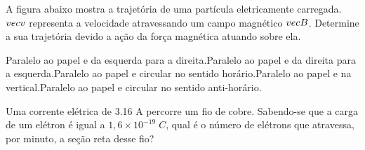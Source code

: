 \documentclass[12pt, addpoints]{exam}
\begin{document}
        \begin{questions}
\begin{multicols*}{2}
\question[20] A ﬁgura abaixo mostra a trajetória de uma partícula eletricamente carregada. $\\vec{{v}}$ representa a velocidade atravessando um campo magnético $\\vec{{B}}$. Determine a sua trajetória devido a ação da força magnética atuando sobre ela.
        
        \begin{center}
            \begin{minipage}[c]{0.5\linewidth}
            \end{minipage}
        \end{center}

        

\begin{choices}
\choice Paralelo ao papel e da esquerda para a direita.\choice Paralelo ao papel e da direita para a esquerda.\choice Paralelo ao papel e circular no sentido horário.\choice Paralelo ao papel e na vertical.\choice Paralelo ao papel e circular no sentido anti-horário.\end{choices}
\question[20] Uma corrente elétrica de    3.16 A percorre um ﬁo de cobre. Sabendo-se que a carga de um elétron é igual a $1,6\times 10^{-19}\;C$, qual é o número de elétrons que atravessa, por minuto, a seção reta desse ﬁo?


\end{multicols*}
\end{questions}
\end{document}
